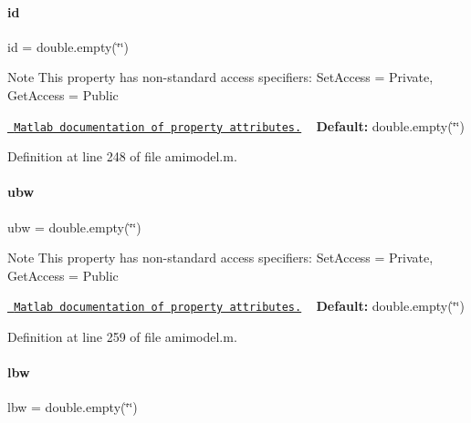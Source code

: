 \paragraph{\texorpdfstring{id}{id}}
{\footnotesize\ttfamily id = double.\+empty(\char`\"{}\char`\"{})}

\begin{DoxyNote}{Note}
This property has non-\/standard access specifiers\+: {\ttfamily Set\+Access = Private, Get\+Access = Public} 

\href{http://www.mathworks.com/help/matlab/matlab_oop/property-attributes.html}{\texttt{ Matlab documentation of property attributes.}} ~\newline
{\bfseries{Default\+:}} double.\+empty(\char`\"{}\char`\"{}) 
\end{DoxyNote}


Definition at line 248 of file amimodel.\+m.

\mbox{\label{classamimodel_a955c9d10635afed4ebc04c60010e5d40}} 
\paragraph{\texorpdfstring{ubw}{ubw}}
{\footnotesize\ttfamily ubw = double.\+empty(\char`\"{}\char`\"{})}

\begin{DoxyNote}{Note}
This property has non-\/standard access specifiers\+: {\ttfamily Set\+Access = Private, Get\+Access = Public} 

\href{http://www.mathworks.com/help/matlab/matlab_oop/property-attributes.html}{\texttt{ Matlab documentation of property attributes.}} ~\newline
{\bfseries{Default\+:}} double.\+empty(\char`\"{}\char`\"{}) 
\end{DoxyNote}


Definition at line 259 of file amimodel.\+m.

\mbox{\label{classamimodel_a784f5fb2b8eda576179be087c2a09a39}} 
\paragraph{\texorpdfstring{lbw}{lbw}}
{\footnotesize\ttfamily lbw = double.\+empty(\char`\"{}\char`\"{})}

